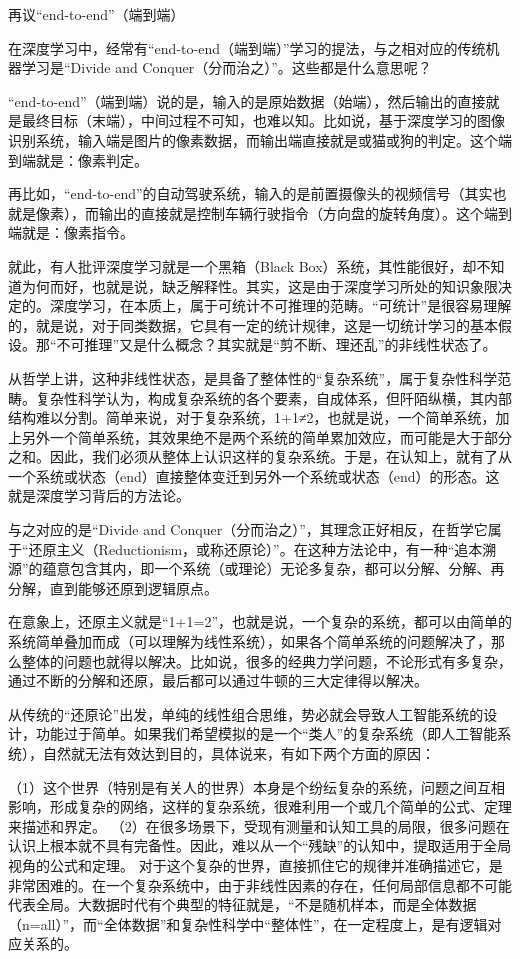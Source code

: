 再议“end-to-end”（端到端）

在深度学习中，经常有“end-to-end（端到端）”学习的提法，与之相对应的传统机器学习是“Divide and Conquer（分而治之）”。这些都是什么意思呢？

“end-to-end”（端到端）说的是，输入的是原始数据（始端），然后输出的直接就是最终目标（末端），中间过程不可知，也难以知。比如说，基于深度学习的图像识别系统，输入端是图片的像素数据，而输出端直接就是或猫或狗的判定。这个端到端就是：像素判定。

再比如，“end-to-end”的自动驾驶系统，输入的是前置摄像头的视频信号（其实也就是像素），而输出的直接就是控制车辆行驶指令（方向盘的旋转角度）。这个端到端就是：像素指令。


就此，有人批评深度学习就是一个黑箱（Black Box）系统，其性能很好，却不知道为何而好，也就是说，缺乏解释性。其实，这是由于深度学习所处的知识象限决定的。深度学习，在本质上，属于可统计不可推理的范畴。“可统计”是很容易理解的，就是说，对于同类数据，它具有一定的统计规律，这是一切统计学习的基本假设。那“不可推理”又是什么概念？其实就是“剪不断、理还乱”的非线性状态了。


从哲学上讲，这种非线性状态，是具备了整体性的“复杂系统”，属于复杂性科学范畴。复杂性科学认为，构成复杂系统的各个要素，自成体系，但阡陌纵横，其内部结构难以分割。简单来说，对于复杂系统，1+1≠2，也就是说，一个简单系统，加上另外一个简单系统，其效果绝不是两个系统的简单累加效应，而可能是大于部分之和。因此，我们必须从整体上认识这样的复杂系统。于是，在认知上，就有了从一个系统或状态（end）直接整体变迁到另外一个系统或状态（end）的形态。这就是深度学习背后的方法论。

与之对应的是“Divide and Conquer（分而治之）”，其理念正好相反，在哲学它属于“还原主义（Reductionism，或称还原论）”。在这种方法论中，有一种“追本溯源”的蕴意包含其内，即一个系统（或理论）无论多复杂，都可以分解、分解、再分解，直到能够还原到逻辑原点。

在意象上，还原主义就是“1+1=2”，也就是说，一个复杂的系统，都可以由简单的系统简单叠加而成（可以理解为线性系统），如果各个简单系统的问题解决了，那么整体的问题也就得以解决。比如说，很多的经典力学问题，不论形式有多复杂，通过不断的分解和还原，最后都可以通过牛顿的三大定律得以解决。

从传统的“还原论”出发，单纯的线性组合思维，势必就会导致人工智能系统的设计，功能过于简单。如果我们希望模拟的是一个“类人”的复杂系统（即人工智能系统），自然就无法有效达到目的，具体说来，有如下两个方面的原因：

（1）这个世界（特别是有关人的世界）本身是个纷纭复杂的系统，问题之间互相影响，形成复杂的网络，这样的复杂系统，很难利用一个或几个简单的公式、定理来描述和界定。
（2）在很多场景下，受现有测量和认知工具的局限，很多问题在认识上根本就不具有完备性。因此，难以从一个“残缺”的认知中，提取适用于全局视角的公式和定理。
对于这个复杂的世界，直接抓住它的规律并准确描述它，是非常困难的。在一个复杂系统中，由于非线性因素的存在，任何局部信息都不可能代表全局。大数据时代有个典型的特征就是，“不是随机样本，而是全体数据（n=all）”，而“全体数据”和复杂性科学中“整体性”，在一定程度上，是有逻辑对应关系的。

